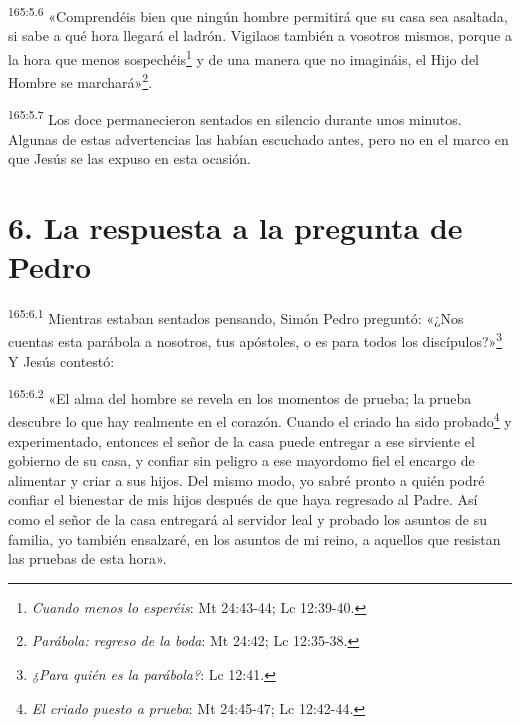 \par
\textsuperscript{165:5.6} «Comprendéis bien que ningún hombre permitirá que su casa sea asaltada, si sabe a qué hora llegará el ladrón. Vigilaos también a vosotros mismos, porque a la hora que menos sospechéis\footnote{\textit{Cuando menos lo esperéis}: Mt 24:43-44; Lc 12:39-40.} y de una manera que no imagináis, el Hijo del Hombre se marchará»\footnote{\textit{Parábola: regreso de la boda}: Mt 24:42; Lc 12:35-38.}.

\par
\textsuperscript{165:5.7} Los doce permanecieron sentados en silencio durante unos minutos. Algunas de estas advertencias las habían escuchado antes, pero no en el marco en que Jesús se las expuso en esta ocasión.

\section*{6. La respuesta a la pregunta de Pedro}
\par
\textsuperscript{165:6.1} Mientras estaban sentados pensando, Simón Pedro preguntó: «¿Nos cuentas esta parábola a nosotros, tus apóstoles, o es para todos los discípulos?»\footnote{\textit{¿Para quién es la parábola?}: Lc 12:41.} Y Jesús contestó:

\par
\textsuperscript{165:6.2} «El alma del hombre se revela en los momentos de prueba; la prueba descubre lo que hay realmente en el corazón. Cuando el criado ha sido probado\footnote{\textit{El criado puesto a prueba}: Mt 24:45-47; Lc 12:42-44.} y experimentado, entonces el señor de la casa puede entregar a ese sirviente el gobierno de su casa, y confiar sin peligro a ese mayordomo fiel el encargo de alimentar y criar a sus hijos. Del mismo modo, yo sabré pronto a quién podré confiar el bienestar de mis hijos después de que haya regresado al Padre. Así como el señor de la casa entregará al servidor leal y probado los asuntos de su familia, yo también ensalzaré, en los asuntos de mi reino, a aquellos que resistan las pruebas de esta hora».

